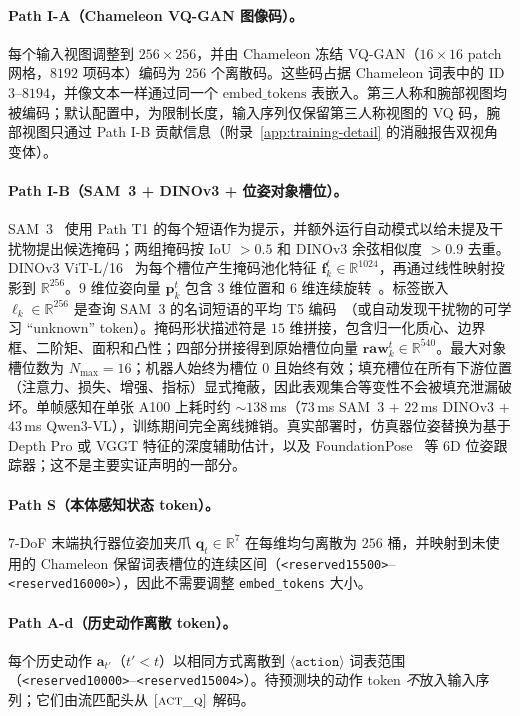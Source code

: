 \paragraph{Path I-A（Chameleon VQ-GAN 图像码）。}
每个输入视图调整到 $256\!\times\!256$，并由 Chameleon 冻结 VQ-GAN（$16\!\times\!16$ patch 网格，$8192$ 项码本）编码为 $256$ 个离散码。这些码占据 Chameleon 词表中的 ID $3$--$8194$，并像文本一样通过同一个 $\mathrm{embed\_tokens}$ 表嵌入。第三人称和腕部视图均被编码；默认配置中，为限制长度，输入序列仅保留第三人称视图的 VQ 码，腕部视图只通过 Path I-B 贡献信息（附录~\ref{app:training-detail} 的消融报告双视角变体）。

\paragraph{Path I-B（SAM~3 + DINOv3 + 位姿对象槽位）。}
SAM~3~\citep{sam3} 使用 Path T1 的每个短语作为提示，并额外运行自动模式以给未提及干扰物提出候选掩码；两组掩码按 IoU $>\!0.5$ 和 DINOv3 余弦相似度 $>\!0.9$ 去重。DINOv3 ViT-L/16~\citep{dinov3} 为每个槽位产生掩码池化特征 $\mathbf{f}_k^t\in\mathbb{R}^{1024}$，再通过线性映射投影到 $\mathbb{R}^{256}$。$9$ 维位姿向量 $\mathbf{p}_k^t$ 包含 $3$ 维位置和 $6$ 维连续旋转~\citep{zhou2019continuity}。标签嵌入 $\boldsymbol{\ell}_k\in\mathbb{R}^{256}$ 是查询 SAM~3 的名词短语的平均 T5 编码~\citep{t5}（或自动发现干扰物的可学习 ``unknown'' token）。掩码形状描述符是 $15$ 维拼接，包含归一化质心、边界框、二阶矩、面积和凸性；四部分拼接得到原始槽位向量 $\mathbf{raw}_k^t\in\mathbb{R}^{540}$。最大对象槽位数为 $N_{\max}=16$；机器人始终为槽位 $0$ 且始终有效；填充槽位在所有下游位置（注意力、损失、增强、指标）显式掩蔽，因此表观集合等变性不会被填充泄漏破坏。单帧感知在单张 A100 上耗时约 $\sim\!138$\,ms（$73$\,ms SAM~3 + $22$\,ms DINOv3 + $43$\,ms Qwen3-VL），训练期间完全离线摊销。真实部署时，仿真器位姿替换为基于 Depth Pro 或 VGGT 特征的深度辅助估计，以及 FoundationPose~\citep{depthpro,vggt,foundationpose} 等 $6$D 位姿跟踪器；这不是主要实证声明的一部分。

\paragraph{Path S（本体感知状态 token）。}
$7$-DoF 末端执行器位姿加夹爪 $\mathbf{q}_t\in\mathbb{R}^{7}$ 在每维均匀离散为 $256$ 桶，并映射到未使用的 Chameleon 保留词表槽位的连续区间（\texttt{<reserved15500>}--\texttt{<reserved16000>}），因此不需要调整 \texttt{embed\_tokens} 大小。

\paragraph{Path A-d（历史动作离散 token）。}
每个历史动作 $\mathbf{a}_{t'}$（$t'<t$）以相同方式离散到 $\langle\texttt{action}\rangle$ 词表范围（\texttt{<reserved10000>}--\texttt{<reserved15004>}）。待预测块的动作 token \emph{不}放入输入序列；它们由流匹配头从 $\textsc{[act\_q]}$ 解码。

